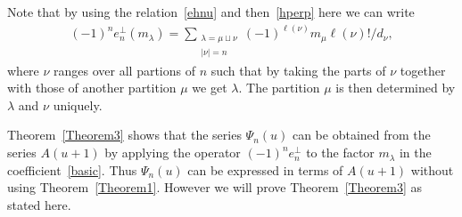 Note that by using the relation~\eqref{ehnu} and then~\eqref{hperp} here we can write
\begin{gather}\label{firstfactor}
(-1)^ne_n^{\perp}(m_\lambda)
=\sum\limits_{\substack{\lambda=\mu\sqcup\nu\\|\nu|=n}}(-1)^{\ell(\nu)}m_\mu\ell(\nu)!/d_\nu,
\end{gather}
where $\nu$ ranges over all partions of $n$ such that by taking the parts of $\nu$ together with those of
another partition $\mu$ we get $\lambda$.
The partition $\mu$ is then determined by $\lambda$ and $\nu$ uniquely.

Theorem~\ref{Theorem3} shows that the series $\Psi_n(u)$ can be obtained from the series $A(u+1)$ by applying the
operator $(-1)^ne_n^{\perp}$ to the factor $m_\lambda$ in the
coef\/f\/icient~\eqref{basic}.
Thus $\Psi_n(u)$ can be expressed in terms of $A(u+1)$ without using Theorem~\ref{Theorem1}.
However we will prove Theorem~\ref{Theorem3} as stated here.

